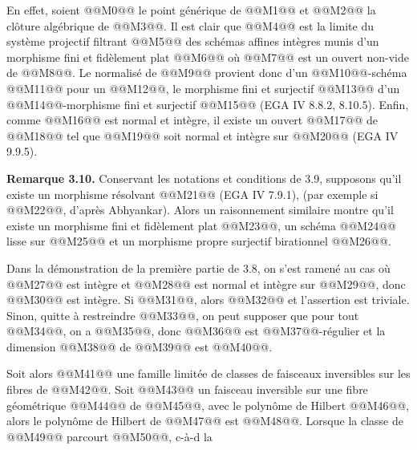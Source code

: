 
En
effet, soient @@M0@@ le point g\'en\'erique de @@M1@@ et @@M2@@ la cl\^oture alg\'ebrique de @@M3@@. Il est clair que @@M4@@ est la limite du syst\`eme projectif filtrant @@M5@@ des sch\'emas affines int\`egres munis d'un morphisme fini et fid\`element plat @@M6@@ o\`u @@M7@@ est un ouvert non-vide de @@M8@@. Le normalis\'e de @@M9@@ provient donc d'un @@M10@@-sch\'ema @@M11@@ pour un @@M12@@, le morphisme fini et surjectif @@M13@@ d'un @@M14@@-morphisme fini et surjectif @@M15@@ (EGA IV 8.8.2, 8.10.5). Enfin, comme @@M16@@ est normal et int\`egre, il existe un ouvert @@M17@@ de @@M18@@ tel que @@M19@@ soit normal et int\`egre sur @@M20@@ (EGA IV 9.9.5).

\textbf{Remarque 3.10.} Conservant les notations et conditions de 3.9, supposons qu'il existe un morphisme r\'esolvant @@M21@@ (EGA IV 7.9.1), (par exemple si @@M22@@, d'apr\`es Abhyankar). Alors un raisonnement similaire montre qu'il existe un morphisme fini et fid\`element plat @@M23@@, un sch\'ema @@M24@@ lisse sur @@M25@@ et un morphisme propre surjectif birationnel @@M26@@.

Dans la d\'emonstration de la premi\`ere partie de 3.8, on s'est ramen\'e au cas o\`u @@M27@@ est int\`egre et @@M28@@ est normal et int\`egre sur @@M29@@, donc @@M30@@ est int\`egre. Si @@M31@@, alors @@M32@@ et l'assertion est triviale. Sinon, quitte \`a restreindre @@M33@@, on peut supposer que pour tout @@M34@@, on a @@M35@@, donc @@M36@@ est @@M37@@-r\'egulier et la dimension @@M38@@ de @@M39@@ est @@M40@@.

Soit alors @@M41@@ une famille limit\'ee de classes de faisceaux inversibles sur les fibres de @@M42@@. Soit @@M43@@ un faisceau inversible sur une fibre g\'eom\'etrique @@M44@@ de @@M45@@, avec le polyn\^ome de Hilbert @@M46@@, alors le polyn\^ome de Hilbert de @@M47@@ est @@M48@@. Lorsque la classe de @@M49@@ parcourt @@M50@@, c-\`a-d la
